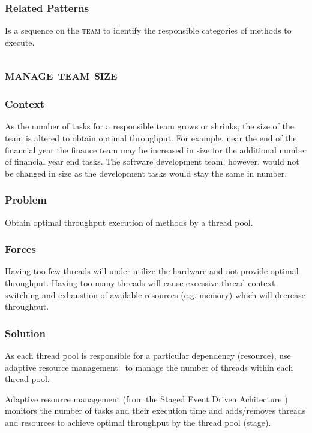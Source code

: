 \documentclass[prodmode]{style/acmlarge}
\begin{document}
\subsubsection*{Related Patterns} Is a sequence on the \textsc{team} to identify
the responsible categories of methods to execute.



\subsection{\textsc{\textbf{manage team size}}}

\subsubsection*{Context} As the number of tasks for a responsible team grows or
shrinks, the size of the team is altered to obtain optimal throughput.  For example,
near the end of the financial year the finance team may be increased in size for
the additional number of financial year end tasks.  The software development
team, however, would not be changed in size as the development tasks would stay
the same in number.

\subsubsection*{Problem} Obtain optimal throughput execution of methods by a
thread pool.

\subsubsection*{Forces} Having too few threads will under utilize the hardware
and not provide optimal throughput.  Having too many threads will cause
excessive thread context-switching and exhaustion of available resources (e.g.
memory) which will decrease throughput.

\subsubsection*{Solution} As each thread pool is responsible for a particular
dependency (resource), use adaptive resource management~\cite{seda} to manage
the number of threads within each thread pool.

Adaptive resource management (from the Staged Event Driven Achitecture
\cite{seda}) monitors the number of tasks and their execution time and
adds/removes threads and resources to achieve optimal throughput by the thread
pool (stage).
\end{document}
